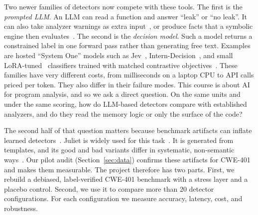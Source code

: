 \documentclass[conference]{IEEEtran}
\newcommand{\cwe}{CWE-401}
\begin{document}
Two newer families of detectors now compete with these tools.
The first is the \emph{prompted LLM}.
An LLM can read a function and answer ``leak'' or ``no leak''.
It can also take analyzer warnings as extra input~\cite{wen2024llm4sa}, or produce facts that a symbolic engine then evaluates~\cite{wang2024nesa,wang2024llmdfa}.
The second is the \emph{decision model}.
Such a model returns a constrained label in one forward pass rather than generating free text.
Examples are hosted ``System One'' models such as Jev~\cite{typesafejev}, Intern-Decision~\cite{zhu2026interndecision}, and small LoRA-tuned~\cite{hu2022lora} classifiers trained with matched contrastive objectives~\cite{zhao2026cyberjev}.
These families have very different costs, from milliseconds on a laptop CPU to API calls priced per token.
They also differ in their failure modes.
This course is about AI for program analysis, and so we ask a direct question.
On the same units and under the same scoring, how do LLM-based detectors compare with established analyzers, and do they read the memory logic or only the surface of the code?

The second half of that question matters because benchmark artifacts can inflate learned detectors~\cite{risse2024limits,risse2025topscore}.
Juliet is widely used for this task~\cite{boland2012juliet,black2018juliet13}.
It is generated from templates, and its good and bad variants differ in systematic, non-semantic ways~\cite{germano2025biased}.
Our pilot audit (Section~\ref{sec:data}) confirms these artifacts for \cwe{} and makes them measurable.
The project therefore has two parts.
First, we rebuild a debiased, label-verified \cwe{} benchmark with a stress layer and a placebo control.
Second, we use it to compare more than 20 detector configurations. %
For each configuration we measure accuracy, latency, cost, and robustness.
\end{document}

